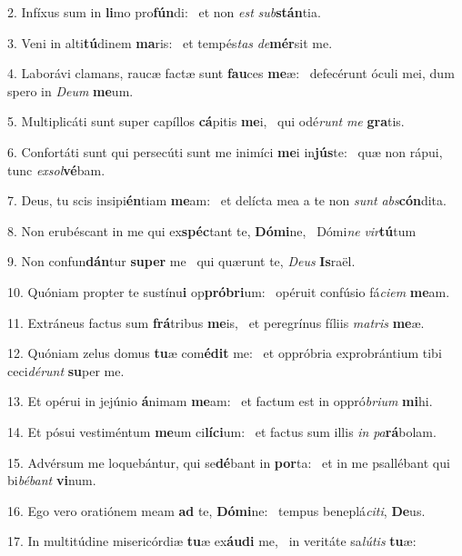 2. Infíxus sum in \textbf{li}mo pro\textbf{fún}di: \ast\  et non \textit{est} \textit{sub}\textbf{stán}tia.\

3. Veni in alti\textbf{tú}dinem \textbf{ma}ris: \ast\  et tempés\textit{tas} \textit{de}\textbf{mér}sit me.\

4. Laborávi clamans, raucæ factæ sunt \textbf{fau}ces \textbf{me}æ: \ast\  defecérunt óculi mei, dum spero in \textit{De}\textit{um} \textbf{me}um.\

5. Multiplicáti sunt super capíllos \textbf{cá}pitis \textbf{me}i, \ast\  qui odé\textit{runt} \textit{me} \textbf{gra}tis.\

6. Confortáti sunt qui persecúti sunt me inimíci \textbf{me}i in\textbf{jús}te: \ast\  quæ non rápui, tunc \textit{ex}\textit{sol}\textbf{vé}bam.\

7. Deus, tu scis insipi\textbf{én}tiam \textbf{me}am: \ast\  et delícta mea a te non \textit{sunt} \textit{abs}\textbf{cón}dita.\

8. Non erubéscant in me qui ex\textbf{spéc}tant te, \textbf{Dó}\textbf{mi}ne, \ast\  Dómi\textit{ne} \textit{vir}\textbf{tú}tum\

9. Non confun\textbf{dán}tur \textbf{su}\textbf{per} me \ast\  qui quærunt te, \textit{De}\textit{us} \textbf{Is}raël.\

10. Quóniam propter te sustínu\textbf{i} op\textbf{pró}\textbf{bri}um: \ast\  opéruit confúsio fá\textit{ci}\textit{em} \textbf{me}am.\

11. Extráneus factus sum \textbf{frá}tribus \textbf{me}is, \ast\  et peregrínus fíliis \textit{ma}\textit{tris} \textbf{me}æ.\

12. Quóniam zelus domus \textbf{tu}æ com\textbf{é}\textbf{dit} me: \ast\  et oppróbria exprobrántium tibi ceci\textit{dé}\textit{runt} \textbf{su}per me.\

13. Et opérui in jejúnio \textbf{á}nimam \textbf{me}am: \ast\  et factum est in oppró\textit{bri}\textit{um} \textbf{mi}hi.\

14. Et pósui vestiméntum \textbf{me}um ci\textbf{lí}\textbf{ci}um: \ast\  et factus sum illis \textit{in} \textit{pa}\textbf{rá}bolam.\

15. Advérsum me loquebántur, qui se\textbf{dé}bant in \textbf{por}ta: \ast\  et in me psallébant qui bi\textit{bé}\textit{bant} \textbf{vi}num.\

16. Ego vero oratiónem meam \textbf{ad} te, \textbf{Dó}\textbf{mi}ne: \ast\  tempus beneplá\textit{ci}\textit{ti}, \textbf{De}us.\

17. In multitúdine misericórdiæ \textbf{tu}æ ex\textbf{áu}\textbf{di} me, \ast\  in veritáte sa\textit{lú}\textit{tis} \textbf{tu}æ:\

